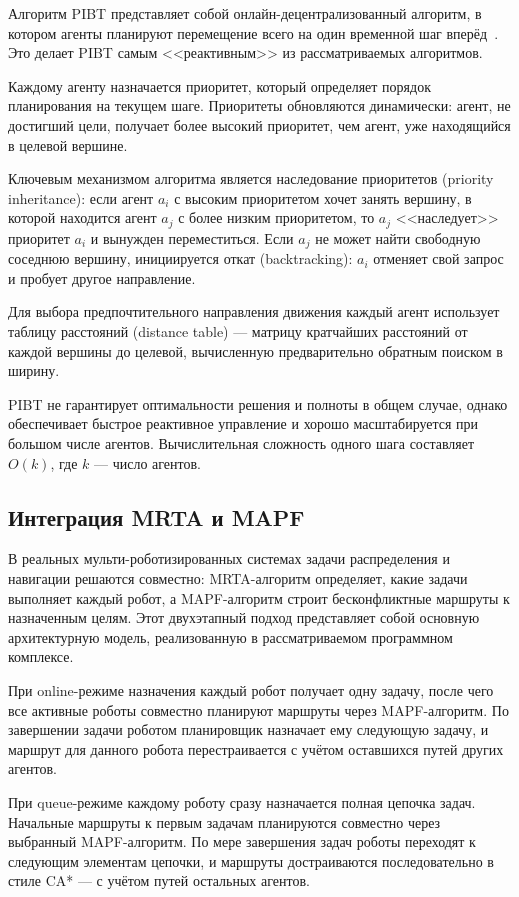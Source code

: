 Алгоритм PIBT представляет собой онлайн-децентрализованный алгоритм, в котором агенты планируют перемещение всего на один временной шаг вперёд~\cite{okumura2022pibt}. Это делает PIBT самым <<реактивным>> из рассматриваемых алгоритмов.

Каждому агенту назначается приоритет, который определяет порядок планирования на текущем шаге. Приоритеты обновляются динамически: агент, не достигший цели, получает более высокий приоритет, чем агент, уже находящийся в целевой вершине.

Ключевым механизмом алгоритма является наследование приоритетов (priority inheritance): если агент $a_i$ с высоким приоритетом хочет занять вершину, в которой находится агент $a_j$ с более низким приоритетом, то $a_j$ <<наследует>> приоритет $a_i$ и вынужден переместиться. Если $a_j$ не может найти свободную соседнюю вершину, инициируется откат (backtracking): $a_i$ отменяет свой запрос и пробует другое направление.

Для выбора предпочтительного направления движения каждый агент использует таблицу расстояний (distance table) --- матрицу кратчайших расстояний от каждой вершины до целевой, вычисленную предварительно обратным поиском в ширину.

PIBT не гарантирует оптимальности решения и полноты в общем случае, однако обеспечивает быстрое реактивное управление и хорошо масштабируется при большом числе агентов. Вычислительная сложность одного шага составляет $O(k)$, где $k$ --- число агентов.

\subsection{Интеграция MRTA и MAPF}

В реальных мульти-роботизированных системах задачи распределения и навигации решаются совместно: MRTA-алгоритм определяет, какие задачи выполняет каждый робот, а MAPF-алгоритм строит бесконфликтные маршруты к назначенным целям. Этот двухэтапный подход представляет собой основную архитектурную модель, реализованную в рассматриваемом программном комплексе.

При online-режиме назначения каждый робот получает одну задачу, после чего все активные роботы совместно планируют маршруты через MAPF-алгоритм. По завершении задачи роботом планировщик назначает ему следующую задачу, и маршрут для данного робота перестраивается с учётом оставшихся путей других агентов.

При queue-режиме каждому роботу сразу назначается полная цепочка задач. Начальные маршруты к первым задачам планируются совместно через выбранный MAPF-алгоритм. По мере завершения задач роботы переходят к следующим элементам цепочки, и маршруты достраиваются последовательно в стиле CA* --- с учётом путей остальных агентов.

